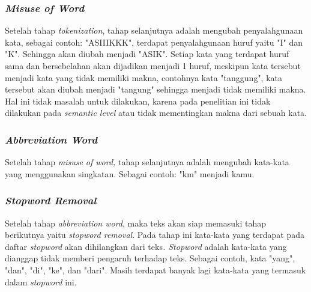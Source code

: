 \subsubsection{\textit{Misuse of Word}}
Setelah tahap \textit{tokenization}, tahap selanjutnya adalah 
mengubah penyalahgunaan kata, sebagai contoh: "ASIIIKKK", terdapat 
penyalahgunaan huruf yaitu "I" dan "K". Sehingga akan diubah menjadi 
"ASIK". Setiap kata yang terdapat huruf sama dan bersebelahan akan 
dijadikan menjadi 1 huruf, meskipun kata tersebut menjadi kata yang 
tidak memiliki makna, contohnya kata "tanggung", kata tersebut akan 
diubah menjadi "tangung" sehingga menjadi tidak memiliki makna. Hal 
ini tidak masalah untuk dilakukan, karena pada penelitian ini tidak 
dilakukan pada \textit{semantic level} atau tidak mementingkan makna 
dari sebuah kata.  
\subsubsection{\textit{Abbreviation Word}}
Setelah tahap \textit{misuse of word, }tahap selanjutnya adalah 
mengubah kata-kata yang menggunakan singkatan. Sebagai contoh: "km" 
menjadi kamu.
\subsubsection{\textit{Stopword Removal}}
Setelah tahap \textit{abbreviation word}, maka teks akan siap 
memasuki tahap berikutnya yaitu \textit{stopword removal}. Pada tahap 
ini kata-kata yang terdapat pada daftar \textit{stopword }akan 
dihilangkan dari teks\textit{. Stopword }adalah kata-kata yang 
dianggap tidak memberi pengaruh terhadap teks. Sebagai contoh, kata 
"yang", "dan", "di", "ke", dan "dari". Masih terdapat banyak 
lagi kata-kata yang termasuk dalam \textit{stopword }ini.
